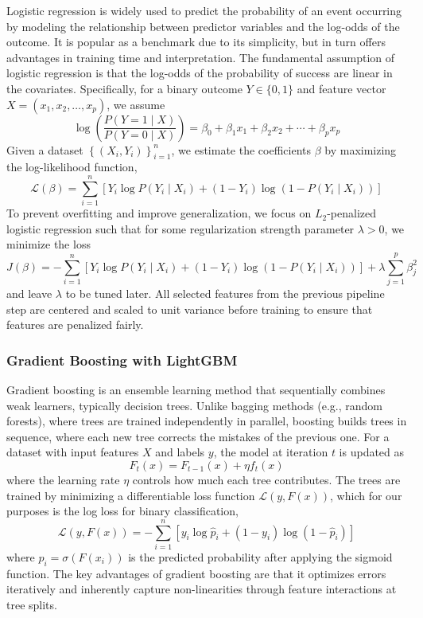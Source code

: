 \documentclass[12pt,twoside]{report}
\begin{document}
Logistic regression is widely used to predict the probability of an event occurring by modeling the relationship between predictor variables and the log-odds of the outcome. It is popular as a benchmark due to its simplicity, but in turn offers advantages in training time and interpretation. The fundamental assumption of logistic regression is that the log-odds of the probability of success are linear in the covariates. Specifically, for a binary outcome $Y \in \{0, 1\}$ and feature vector $X = (x_1, x_2, \ldots, x_p)$, we assume
$$\log \left( \frac{P(Y = 1 \mid X)}{P(Y = 0 \mid X)} \right) = \beta_0 + \beta_1 x_1 + \beta_2 x_2 + \cdots + \beta_p x_p$$
Given a dataset $\left\{(X_i, Y_i) \right\}_{i=1}^{n}$, we estimate the coefficients $\beta$ by maximizing the log-likelihood function,
$$\mathcal{L}(\beta) = \sum_{i=1}^{n} \left[ Y_i \log P(Y_i \mid X_i) + (1 - Y_i) \log (1 - P(Y_i \mid X_i)) \right]$$
To prevent overfitting and improve generalization, we focus on $L_2$-penalized logistic regression such that for some regularization strength parameter $\lambda > 0$, we minimize the loss
$$J(\beta) = - \sum_{i=1}^{n} \left[ Y_i \log P(Y_i \mid X_i) + (1 - Y_i) \log (1 - P(Y_i \mid X_i)) \right] + \lambda \sum_{j=1}^{p} \beta_j^2$$
and leave $\lambda$ to be tuned later. All selected features from the previous pipeline step are centered and scaled to unit variance before training to ensure that features are penalized fairly.

\subsubsection{Gradient Boosting with LightGBM}

Gradient boosting is an ensemble learning method that sequentially combines weak learners, typically decision trees. Unlike bagging methods (e.g., random forests), where trees are trained independently in parallel, boosting builds trees in sequence, where each new tree corrects the mistakes of the previous one. For a dataset with input features $X$ and labels $y$, the model at iteration $t$ is updated as 
$$F_t (x) = F_{t - 1}(x) + \eta f_t(x)$$
where the learning rate $\eta$ controls how much each tree contributes. The trees are trained by minimizing a differentiable loss function $\mathcal{L}(y, F(x))$, which for our purposes is the log loss for binary classification,
$$\mathcal{L}(y, F(x)) = - \sum_{i=1}^{n} [y_i \log \hat{p}_i + (1 - y_i) \log (1 - \hat{p}_i)]$$
where $\hat{p}_i = \sigma(F(x_i))$ is the predicted probability after applying the sigmoid function. The key advantages of gradient boosting are that it optimizes errors iteratively and inherently capture non-linearities through feature interactions at tree splits. 
\end{document}
